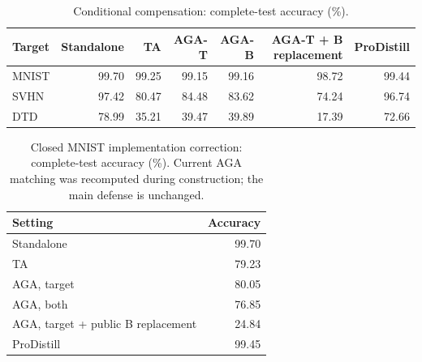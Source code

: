 \begin{table}[t]
\centering\small
\caption{Conditional compensation: complete-test accuracy (\%).}
\begin{tabular}{@{}lrrrrrr@{}}
\toprule
Target & Standalone & TA & AGA-T & AGA-B & AGA-T + B replacement & ProDistill \\
\midrule
MNIST & 99.70 & 99.25 & 99.15 & 99.16 & 98.72 & 99.44 \\
SVHN & 97.42 & 80.47 & 84.48 & 83.62 & 74.24 & 96.74 \\
DTD & 78.99 & 35.21 & 39.47 & 39.89 & 17.39 & 72.66 \\
\bottomrule
\end{tabular}
\end{table}

\begin{table}[t]
\centering\small
\caption{Closed MNIST implementation correction: complete-test accuracy (\%). Current AGA matching was recomputed during construction; the main defense is unchanged.}
\begin{tabular}{@{}lr@{}}
\toprule
Setting & Accuracy \\
\midrule
Standalone & 99.70 \\
TA & 79.23 \\
AGA, target & 80.05 \\
AGA, both & 76.85 \\
AGA, target + public B replacement & 24.84 \\
ProDistill & 99.45 \\
\bottomrule
\end{tabular}
\end{table}
